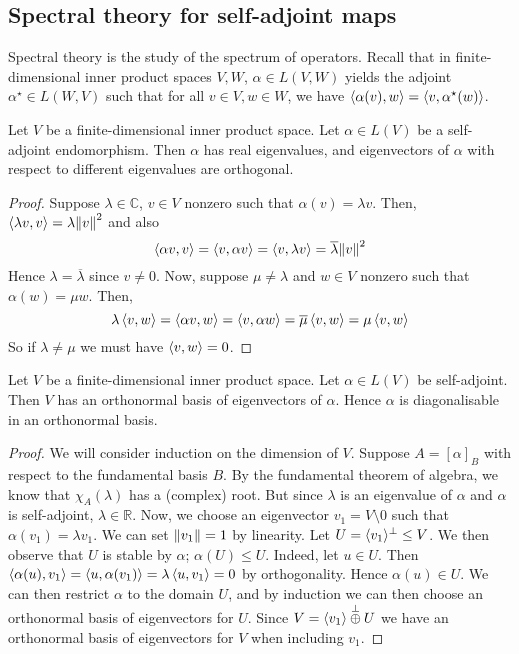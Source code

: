 \subsection{Spectral theory for self-adjoint maps}
Spectral theory is the study of the spectrum of operators.
Recall that in finite-dimensional inner product spaces \( V, W \), \( \alpha \in L(V, W) \) yields the adjoint \( \alpha^\star \in L(W, V) \) such that for all \( v \in V, w \in W \), we have \( \left\langle{\alpha(v), w}\right\rangle = \left\langle{v, \alpha^\star(w)}\right\rangle \).
\begin{lemma}
	Let \( V \) be a finite-dimensional inner product space.
	Let \( \alpha \in L(V) \) be a self-adjoint endomorphism.
	Then \( \alpha \) has real eigenvalues, and eigenvectors of \( \alpha \) with respect to different eigenvalues are orthogonal.
\end{lemma}
\begin{proof}
	Suppose \( \lambda \in \mathbb C \), \( v \in V \) nonzero such that \( \alpha(v) = \lambda v \).
	Then, \( \left\langle{\lambda v, v}\right\rangle = \lambda \norm{v}^2 \) and also
	\[
		\left\langle{\alpha v, v}\right\rangle = \left\langle{v, \alpha v}\right\rangle = \left\langle{v, \lambda v}\right\rangle = \overline{\lambda} \norm{v}^2
	\]
	Hence \( \lambda = \overline{\lambda} \) since \( v \neq 0 \).
	Now, suppose \( \mu \neq \lambda \) and \( w \in V \) nonzero such that \( \alpha(w) = \mu w \).
	Then,
	\[
		\lambda \left\langle{v, w}\right\rangle = \left\langle{\alpha v, w}\right\rangle = \left\langle{v, \alpha w}\right\rangle = \overline{\mu} \left\langle{v, w}\right\rangle = \mu \left\langle{v,w}\right\rangle
	\]
	So if \( \lambda \neq \mu \) we must have \( \left\langle{v,w}\right\rangle = 0 \).
\end{proof}
\begin{theorem}
	Let \( V \) be a finite-dimensional inner product space.
	Let \( \alpha \in L(V) \) be self-adjoint.
	Then \( V \) has an orthonormal basis of eigenvectors of \( \alpha \).
	Hence \( \alpha \) is diagonalisable in an orthonormal basis.
\end{theorem}
\begin{proof}
	We will consider induction on the dimension of \( V \).
	Suppose \( A = [\alpha]_B \) with respect to the fundamental basis \( B \).
	By the fundamental theorem of algebra, we know that \( \chi_A(\lambda) \) has a (complex) root.
	But since \( \lambda \) is an eigenvalue of \( \alpha \) and \( \alpha \) is self-adjoint, \( \lambda \in \mathbb R \).
	Now, we choose an eigenvector \( v_1 = V \setminus \qty{0} \) such that \( \alpha(v_1) = \lambda v_1 \).
	We can set \( \norm{v_1} = 1 \) by linearity.
	Let \( U = \langle{} v_1 \rangle^\perp \leq V \).
	We then observe that \( U \) is stable by \( \alpha \); \( \alpha(U) \leq U \).
	Indeed, let \( u \in U \).
	Then \( \left\langle{\alpha(u), v_1}\right\rangle = \left\langle{u, \alpha(v_1)}\right\rangle = \lambda \left\langle{u, v_1}\right\rangle = 0 \) by orthogonality.
	Hence \( \alpha(u) \in U \).
	We can then restrict \( \alpha \) to the domain \( U \), and by induction we can then choose an orthonormal basis of eigenvectors for \( U \).
	Since \( V = \langle{} v_1 \rangle \overset{\perp}{\oplus} U \) we have an orthonormal basis of eigenvectors for \( V \) when including \( v_1 \).
\end{proof}
